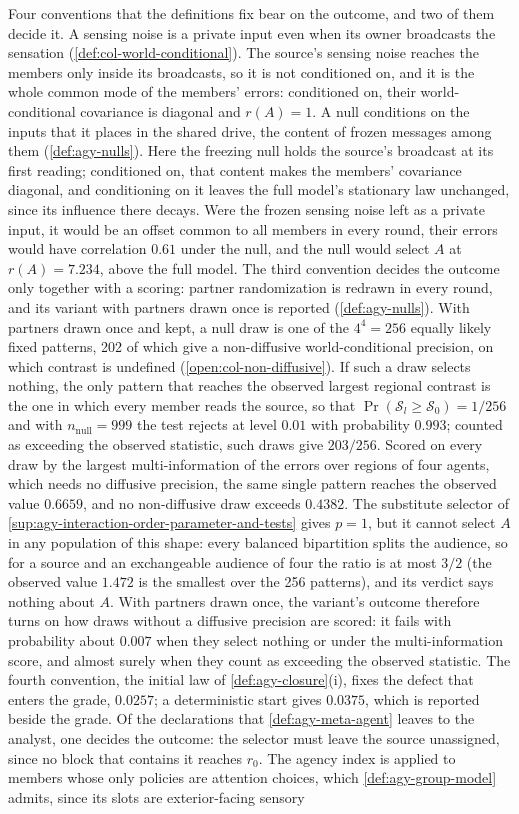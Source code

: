 Four conventions that the definitions fix bear on the outcome, and two of them decide it. A sensing noise is a private input even when its owner broadcasts the sensation (\cref{def:col-world-conditional}). The source's sensing noise reaches the members only inside its broadcasts, so it is not conditioned on, and it is the whole common mode of the members' errors: conditioned on, their world-conditional covariance is diagonal and $r(A)=1$. A null conditions on the inputs that it places in the shared drive, the content of frozen messages among them (\cref{def:agy-nulls}). Here the freezing null holds the source's broadcast at its first reading; conditioned on, that content makes the members' covariance diagonal, and conditioning on it leaves the full model's stationary law unchanged, since its influence there decays. Were the frozen sensing noise left as a private input, it would be an offset common to all members in every round, their errors would have correlation $0.61$ under the null, and the null would select $A$ at $r(A)=7.234$, above the full model. The third convention decides the outcome only together with a scoring: partner randomization is redrawn in every round, and its variant with partners drawn once is reported (\cref{def:agy-nulls}). With partners drawn once and kept, a null draw is one of the $4^4=256$ equally likely fixed patterns, 202 of which give a non-diffusive world-conditional precision, on which contrast is undefined (\cref{open:col-non-diffusive}). If such a draw selects nothing, the only pattern that reaches the observed largest regional contrast is the one in which every member reads the source, so that $\Pr(\mathcal S_l\ge\mathcal S_0)=1/256$ and with $n_{\mathrm{null}}=999$ the test rejects at level $0.01$ with probability $0.993$; counted as exceeding the observed statistic, such draws give $203/256$. Scored on every draw by the largest multi-information of the errors over regions of four agents, which needs no diffusive precision, the same single pattern reaches the observed value $0.6659$, and no non-diffusive draw exceeds $0.4382$. The substitute selector of \cref{sup:agy-interaction-order-parameter-and-tests} gives $p=1$, but it cannot select $A$ in any population of this shape: every balanced bipartition splits the audience, so for a source and an exchangeable audience of four the ratio is at most $3/2$ (the observed value $1.472$ is the smallest over the 256 patterns), and its verdict says nothing about $A$. With partners drawn once, the variant's outcome therefore turns on how draws without a diffusive precision are scored: it fails with probability about $0.007$ when they select nothing or under the multi-information score, and almost surely when they count as exceeding the observed statistic. The fourth convention, the initial law of \cref{def:agy-closure}(i), fixes the defect that enters the grade, $0.0257$; a deterministic start gives $0.0375$, which is reported beside the grade. Of the declarations that \cref{def:agy-meta-agent} leaves to the analyst, one decides the outcome: the selector must leave the source unassigned, since no block that contains it reaches $r_0$. The agency index is applied to members whose only policies are attention choices, which \cref{def:agy-group-model} admits, since its slots are exterior-facing sensory 